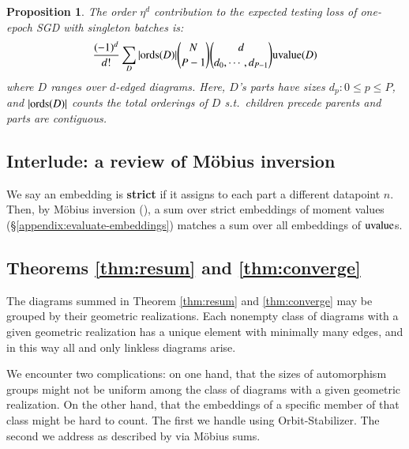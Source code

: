 \documentclass[anon,12pt]{colt2021} %
\newtheorem{prop}{Proposition}
\newcommand{\uvalue}{\text{\textnormal{uvalue}}}
\newcommand{\ords}{\text{\textnormal{ords}}}
\begin{document}
        \begin{prop} \label{prop:vanilla}
            The order $\eta^d$ contribution to the expected testing loss of
            one-epoch SGD with singleton batches is:
            \begin{equation*}\label{eq:sgdbasiccoef}
                \frac{(-1)^d}{d!} \sum_{D} 
                |\ords(D)| {N \choose P-1} {d \choose d_0,\cdots,d_{P-1}}
                \uvalue(D)
            \end{equation*}
            where $D$ ranges over $d$-edged diagrams.  Here, $D$'s parts have
            sizes $d_p: 0\leq p\leq P$, and $|\ords(D)|$ counts the total
            orderings of $D$ s.t.\ children precede parents and parts are
            contiguous.
        \end{prop}

    \subsection{Interlude: a review of M\"obius inversion}          \label{appendix:mobius}

        We say an embedding is \textbf{strict} if it assigns to each part
        a different datapoint $n$.
        Then, by M\"obius inversion (\cite{ro64}), a sum over strict embeddings
        of moment values (\S\ref{appendix:evaluate-embeddings}) matches 
        a sum over all embeddings of $\uvalue$s.

    \subsection{Theorems \ref{thm:resum} and \ref{thm:converge}}    \label{appendix:resum}

        The diagrams summed in Theorem \ref{thm:resum} and \ref{thm:converge}
        may be grouped by their geometric realizations.  Each nonempty class of
        diagrams with a given geometric realization has a unique element with
        minimally many edges, and in this way all and only linkless diagrams
        arise. 

        We encounter two complications: on one hand, that the sizes of
        automorphism groups might not be uniform among the class of diagrams
        with a given geometric realization.  On the other hand, that the
        embeddings of a specific member of that class might be hard to count.
        The first we handle using Orbit-Stabilizer.  The second we address as
        described by \label{subsubsect:mobius} via M\"obius sums.
           
\end{document}
